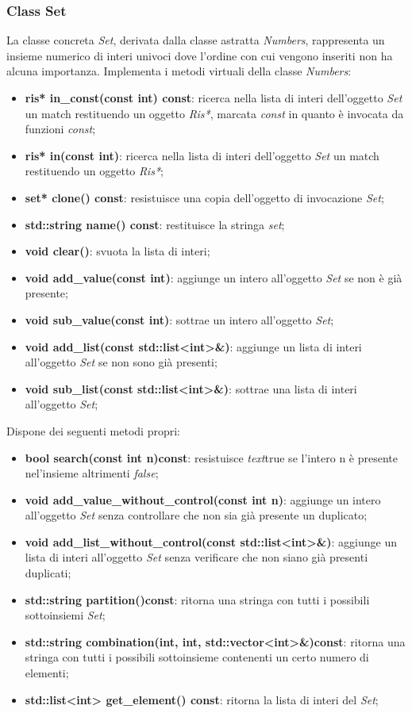 \documentclass[a4paper,10pt]{article}
\begin{document}
    \subsubsection{Class Set}
    La classe concreta \textit{Set}, derivata dalla classe astratta \textit{Numbers}, rappresenta un insieme numerico di interi univoci dove l’ordine con cui vengono inseriti non ha alcuna importanza. 
    Implementa i metodi virtuali della classe \textit{Numbers}:
	\begin{itemize}
		\item \textbf{ris* in\_const(const int) const}: ricerca nella lista di interi dell'oggetto \textit{Set} un match restituendo un oggetto \textit{Ris*}, marcata \textit{const} in quanto è invocata da funzioni \textit{const};
		\item \textbf{ris* in(const int)}: ricerca nella lista di interi dell'oggetto \textit{Set} un match restituendo un oggetto \textit{Ris*};
        \item \textbf{set* clone() const}: resistuisce una copia dell'oggetto di invocazione \textit{Set};
		\item \textbf{std::string name() const}: restituisce la stringa \textit{set};
		\item \textbf{void clear()}: svuota la lista di interi;
        \item \textbf{void add\_value(const int)}: aggiunge un intero all'oggetto \textit{Set} se non è già presente;
		\item \textbf{void sub\_value(const int)}: sottrae un intero all'oggetto \textit{Set};
		\item \textbf{void add\_list(const std::list<int>\&)}: aggiunge un lista di interi all'oggetto \textit{Set} se non sono già presenti;
        \item \textbf{void sub\_list(const std::list<int>\&)}: sottrae una lista di interi all'oggetto \textit{Set};
    \end{itemize}
    Dispone dei seguenti metodi propri:
    \begin{itemize}
        \item \textbf{bool search(const int n)const}: resistuisce \textit{text}{true} se l'intero n è presente nel'insieme altrimenti \textit{false};
        \item \textbf{void add\_value\_without\_control(const int n)}: aggiunge un intero all'oggetto \textit{Set} senza controllare che non sia già presente un duplicato;
        \item \textbf{void add\_list\_without\_control(const std::list<int>\&)}: aggiunge un lista di interi all'oggetto \textit{Set} senza verificare che non siano già presenti duplicati;
        \item \textbf{std::string partition()const}: ritorna una stringa con tutti i possibili sottoinsiemi \textit{Set};
        \item \textbf{std::string combination(int, int, std::vector<int>\&)const}: ritorna una stringa con tutti i possibili sottoinsieme contenenti un certo numero di elementi;
        \item \textbf{std::list<int> get\_element() const}: ritorna la lista di interi del \textit{Set};

    \end{itemize}
\end{document}
